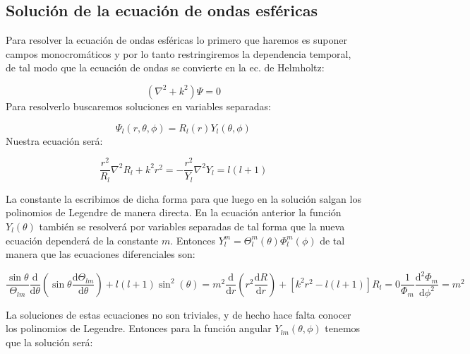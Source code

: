 \documentclass[12pt,a4paper]{article}
\newcommand{\parentesis}[1]{\left( #1  \right)}
\newcommand{\ccorchetes}[1]{\left[ #1  \right]}
\newcommand{\derivadas}[2]{\frac{\D #1}{\D #2}}
\newcommand{\D}{\mathrm{d}}
\numberwithin{equation}{section}
\numberwithin{figure}{section}
\begin{document}
\subsection{Solución de la ecuación de ondas esféricas}

Para resolver la ecuación de ondas esféricas lo primero que haremos es suponer campos monocromáticos y por lo tanto restringiremos la dependencia temporal, de tal modo que la ecuación de ondas se convierte en la ec. de Helmholtz:

\begin{equation}
\parentesis{\nabla^2 + k^2 } \Psi = 0
\end{equation}
Para resolverlo buscaremos soluciones en variables separadas:

\begin{equation}
\Psi_l ( r, \theta, \phi) = R_l (r) Y_l (\theta, \phi)
\end{equation}
Nuestra ecuación será:

\begin{equation}
\dfrac{r^2}{R_l} \nabla^2 R_l + k^2 r^2 = - \dfrac{r^2}{Y_l} \nabla^2 Y_l = l(l+1)
\end{equation}

La constante la escribimos de dicha forma para que luego en la solución salgan los polinomios de Legendre de manera directa. En la ecuación anterior la función $Y_l(\theta)$ también se resolverá por variables separadas de tal forma que la nueva ecuación dependerá de la constante $m$. Entonces $Y_l^m = \Theta_{l}^m (\theta) \Phi_l^m (\phi)$ de tal manera que las ecuaciones diferenciales son:


\begin{subequations}
\begin{equation}
\dfrac{\sin \theta}{\Theta_{lm}} \derivadas{}{\theta} \parentesis{\sin \theta \derivadas{\Theta_{lm}}{\theta}} + l (l+1) \sin^2 (\theta) = m^2
\end{equation}
\begin{equation}
\derivadas{}{r} \parentesis{r^2 \derivadas{R}{r}} + \ccorchetes{k^2 r^2 - l(l+1)} R_l = 0
\end{equation}
\begin{equation}
\dfrac{1}{\Phi_m} \derivadas{^2 \Phi_m}{\phi^2} = m^2
\end{equation}
\end{subequations}

La soluciones de estas ecuaciones no son triviales, y de hecho hace falta conocer los polinomios de Legendre. Entonces para la función angular $Y_{lm} (\theta, \phi)$ tenemos que la solución será:
\end{document}
